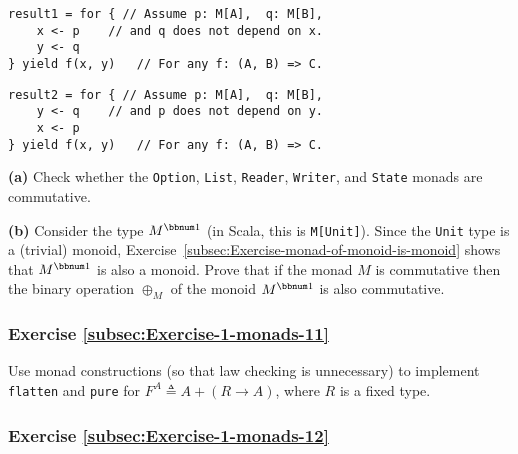 \noindent \texttt{\textcolor{blue}{\footnotesize{}}}%
\begin{minipage}[c]{0.475\columnwidth}%
\texttt{\textcolor{blue}{\footnotesize{}}}
\begin{lstlisting}
result1 = for { // Assume p: M[A],  q: M[B],
    x <- p    // and q does not depend on x.
    y <- q
} yield f(x, y)   // For any f: (A, B) => C.
\end{lstlisting}
%
\end{minipage}\texttt{\textcolor{blue}{\footnotesize{}\hspace*{\fill}}}%
\begin{minipage}[c]{0.475\columnwidth}%
\texttt{\textcolor{blue}{\footnotesize{}}}
\begin{lstlisting}
result2 = for { // Assume p: M[A],  q: M[B],
    y <- q    // and p does not depend on y.
    x <- p
} yield f(x, y)   // For any f: (A, B) => C.
\end{lstlisting}
%
\end{minipage}{\footnotesize\par}

\noindent \vspace{0\baselineskip}

\textbf{(a)} Check whether the \lstinline!Option!, \lstinline!List!,
\lstinline!Reader!, \lstinline!Writer!, and \lstinline!State! monads
are commutative.

\textbf{(b)} Consider the type $M^{\bbnum 1}$ (in Scala, this is
\lstinline!M[Unit]!). Since the \lstinline!Unit! type is a (trivial)
monoid, Exercise~\ref{subsec:Exercise-monad-of-monoid-is-monoid}
shows that $M^{\bbnum 1}$ is also a monoid. Prove that if the monad
$M$ is commutative then the binary operation $\oplus_{M}$ of the
monoid $M^{\bbnum 1}$ is also commutative. 

\subsubsection{Exercise \label{subsec:Exercise-1-monads-11}\ref{subsec:Exercise-1-monads-11}}

Use monad constructions (so that law checking is unnecessary) to implement
\lstinline!flatten! and \lstinline!pure! for $F^{A}\triangleq A+\left(R\rightarrow A\right)$,
where $R$ is a fixed type.

\subsubsection{Exercise \label{subsec:Exercise-1-monads-12}\ref{subsec:Exercise-1-monads-12}}

